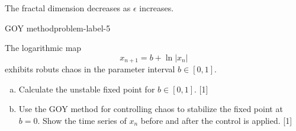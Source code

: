 \begin{enumerate}[(a)]
    The fractal dimension decreases as $\epsilon$ increases.
\end{enumerate}

\begin{problem}{GOY method}{problem-label-5}

The logarithmic map
\[
x_{n+1}=b+\ln|x_n|
\]
exhibits robuts chaos in the parameter interval $b \in [0,1]$.

\begin{enumerate}[(a)]
    \item Calculate the unstable fixed point for $b \in [0,1]$. [1]
    \item Use the GOY method for controlling chaos to stabilize the fixed point at $b=0$.
    Show the time series of $x_n$ before and after the control is applied. [1]
\end{enumerate}
\end{problem}

